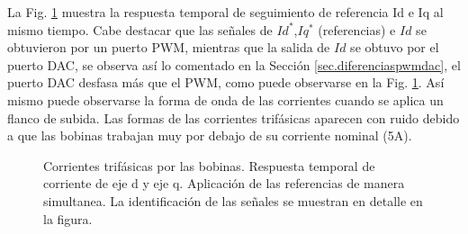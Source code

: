 \documentclass{report}
\begin{document}
La Fig. \ref{fig.20191219_134238_079} muestra la respuesta temporal de seguimiento de referencia Id e Iq al mismo tiempo. Cabe destacar que las señales de $Id^{*}$,$Iq^{*}$ (referencias) e $Id$ se obtuvieron por un puerto PWM, mientras que la salida de $Id$ se obtuvo por el puerto DAC, se observa así lo comentado en la Sección \ref{sec.diferenciaspwmdac}, el puerto DAC desfasa más que el PWM, como puede observarse en la Fig. \ref{fig.20191219_134238_079}. Así mismo puede observarse la forma de onda de las corrientes cuando se aplica un flanco de subida. Las formas de las corrientes trifásicas aparecen con ruido debido a que las bobinas trabajan muy por debajo de su corriente nominal (5A).

\begin{figure}[!h]
    \begin{center}
    \resizebox{12cm}{!}{\texttt{[image: 20191219\_134238\_079]}}
    \caption{Corrientes trifásicas por las bobinas. Respuesta temporal de corriente de eje d y eje q. Aplicación de las referencias de manera simultanea. La identificación de las señales se muestran en detalle en la figura.}\label{fig.20191219_134238_079}
    \end{center}
\end{figure}
\begin{comment}

\begin{table}[!h]
    \begin{minipage}{\textwidth}
    \begin{center}
    \begin{tabular}{|c|c|c|c|c|c|} \hline\hline\hline
    Canal & Color & Elemento & Amplitud (V) & Nº Espiras & Amperaje (A) \\ \hline
    1 & Amarillo & $I_{a}$ & 4.41 & 5 & 0.882 \\ \hline
    2 & Verde & $I_{b}$ & 4.16 & 5 & 0.832 \\ \hline   
    3 & Rosa & $I_{c}$ & 4.38 & 5 &  0.876\\ \hline
    4 \footnote{Medidas no disponibles}& Azul Claro  & $I_{d}$ & - & - & - \\ \hline
    5 \footnote{Medidas no disponibles}  & Rojo & $I_{d}^{ref}$ & - & - & - \\ \hline
    6 \footnote{Medidas no disponibles}& Naranja & $I_{q}$ & - & - &  -\\ \hline
    9 \footnote{Medidas no disponibles}& Azul Oscuro & $I_{q}^{ref}$ & - & - & - \\ \hline


    \end{tabular}
    \end{center}
    \caption{Tabla con los datos de la Fig. \ref{fig.20191219_134238_079}) con las corrientes trifásicas.} \label{tab.20191219_134238_079}
\end{minipage}
\end{table}
\end{comment}
\end{document}
